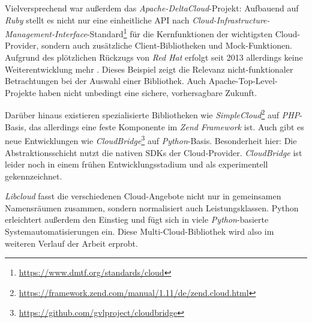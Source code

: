\noindent Vielversprechend war außerdem das \emph{Apache-DeltaCloud}-Projekt: Aufbauend auf \emph{Ruby} stellt es nicht nur eine einheitliche API nach \emph{Cloud-Infrastructure-Management-Interface}-Standard\footnote{\url{https://www.dmtf.org/standards/cloud}} für die Kernfunktionen der wichtigsten Cloud-Provider, sondern auch zusätzliche Client-Bibliotheken und Mock-Funktionen. Aufgrund des plötzlichen Rückzugs von \emph{Red Hat} erfolgt seit 2013 allerdings keine Weiterentwicklung mehr \cite{androu:2013:deltacloud-red-hat-end}. Dieses Beispiel zeigt die Relevanz nicht-funktionaler Betrachtungen bei der Auswahl einer Bibliothek. Auch Apache-Top-Level-Projekte haben nicht unbedingt eine sichere, vorhersagbare Zukunft.

Darüber hinaus existieren spezialisierte Bibliotheken wie \emph{SimpleCloud}\footnote{\url{https://framework.zend.com/manual/1.11/de/zend.cloud.html}} auf \emph{PHP}-Basis, das allerdings eine feste Komponente im \emph{Zend Framework} ist. Auch gibt es neue Entwicklungen wie \emph{CloudBridge}\footnote{\url{https://github.com/gvlproject/cloudbridge}} auf \emph{Python}-Basis. Besonderheit hier: Die Abstraktionsschicht nutzt die nativen SDKs der Cloud-Provider. \emph{CloudBridge} ist leider noch in einem frühen Entwicklungsstadium und als experimentell gekennzeichnet.

\emph{Libcloud} fasst die verschiedenen Cloud-Angebote nicht nur in gemeinsamen Namensräumen zusammen, sondern normalisiert auch Leistungsklassen. Python erleichtert außerdem den Einstieg und fügt sich in viele \emph{Python}-basierte Systemautomatisierungen ein. Diese Multi-Cloud-Bibliothek wird also im weiteren Verlauf der Arbeit erprobt.
